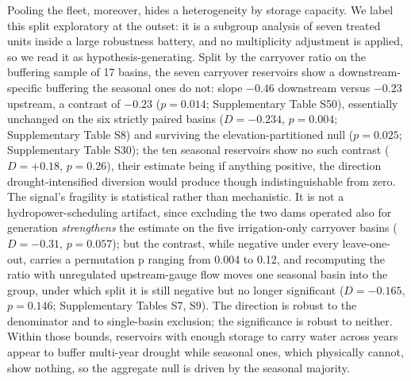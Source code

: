 \documentclass[
]{agujournal2019}
\begin{document}
Pooling the fleet, moreover, hides a heterogeneity by storage capacity.
We label this split exploratory at the outset: it is a subgroup analysis
of seven treated units inside a large robustness battery, and no
multiplicity adjustment is applied, so we read it as
hypothesis-generating. Split by the carryover ratio on the buffering
sample of 17 basins, the seven carryover reservoirs show a
downstream-specific buffering the seasonal ones do not: slope \(-0.46\)
downstream versus \(-0.23\) upstream, a contrast of \(-0.23\)
(\(p = 0.014\); Supplementary Table S50), essentially unchanged on the
six strictly paired basins (\(D = -0.234\), \(p = 0.004\); Supplementary
Table S8) and surviving the elevation-partitioned null (\(p = 0.025\);
Supplementary Table S30); the ten seasonal reservoirs show no such
contrast (\(D = +0.18\), \(p = 0.26\)), their estimate being if anything
positive, the direction drought-intensified diversion would produce
though indistinguishable from zero. The signal's fragility is
statistical rather than mechanistic. It is not a hydropower-scheduling
artifact, since excluding the two dams operated also for generation
\emph{strengthens} the estimate on the five irrigation-only carryover
basins (\(D = -0.31\), \(p = 0.057\)); but the contrast, while negative
under every leave-one-out, carries a permutation p ranging from 0.004 to
0.12, and recomputing the ratio with unregulated upstream-gauge flow
moves one seasonal basin into the group, under which split it is still
negative but no longer significant (\(D = -0.165\), \(p = 0.146\);
Supplementary Tables S7, S9). The direction is robust to the denominator
and to single-basin exclusion; the significance is robust to neither.
Within those bounds, reservoirs with enough storage to carry water
across years appear to buffer multi-year drought while seasonal ones,
which physically cannot, show nothing, so the aggregate null is driven
by the seasonal majority.
\end{document}
